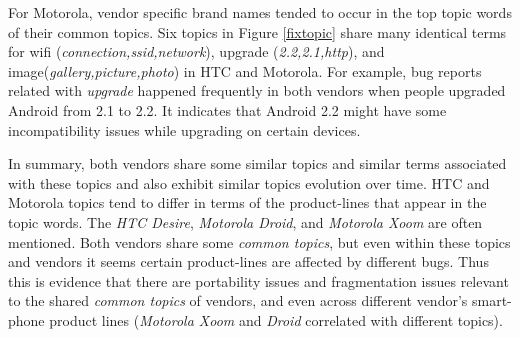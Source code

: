 \documentclass[10pt, conference, compsocconf]{IEEEtran}
\begin{document}
For Motorola, vendor specific brand names tended to occur in the top
topic words of their common topics.
Six topics in Figure \ref{fixtopic} share many identical terms for
wifi (\textit{connection,ssid,network}), upgrade
(\textit{2.2,2.1,http}), and image(\textit{gallery,picture,photo}) in
HTC and Motorola. For example, bug reports related with
\textit{upgrade} happened frequently in both vendors when people
upgraded Android from 2.1 to 2.2. It indicates that Android 2.2 might have
some incompatibility issues while upgrading on certain devices.  


In summary, both vendors share some similar topics and similar terms associated
with these topics and also exhibit similar topics evolution over
time. 
HTC and Motorola topics tend to differ in terms of the
product-lines that appear in the topic words.
The \emph{HTC Desire}, \emph{Motorola Droid}, and  \emph{Motorola Xoom} are often
mentioned.
Both vendors share some \emph{common topics}, but even within these
topics and vendors it seems certain product-lines are affected by
different bugs. Thus this is evidence that there are portability
issues and fragmentation issues relevant to the shared \emph{common topics}
of vendors, and even across different vendor's smart-phone product
lines (\emph{Motorola Xoom} and \emph{Droid} correlated with different topics).


\end{document}
